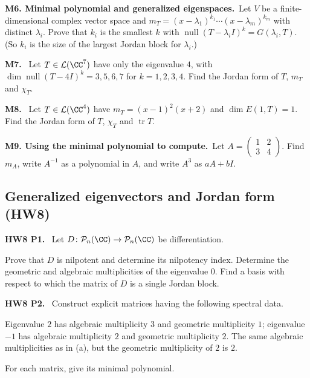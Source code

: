 \documentclass[10pt]{scrartcl}
\DeclareMathOperator{\nul}{null}
\DeclareMathOperator{\tr}{tr}
\newcommand{\LL}{\mathcal L}
\newcommand{\PP}{\mathcal P}
\newenvironment{prob}{\par\bigskip\noindent\begin{minipage}{\linewidth}\setlength{\parskip}{4pt}}{\end{minipage}\par}
\begin{document}
\begin{prob}
\textbf{M6. Minimal polynomial and generalized eigenspaces.}\ Let $V$ be a finite-dimensional complex vector space and $m_T=(x-\lambda_1)^{k_1}\cdots(x-\lambda_m)^{k_m}$ with distinct $\lambda_i$. Prove that $k_i$ is the smallest $k$ with $\nul(T-\lambda_iI)^k=G(\lambda_i,T)$. (So $k_i$ is the size of the largest Jordan block for $\lambda_i$.)
\end{prob}

\begin{prob}
\textbf{M7. }\ Let $T\in\LL(\CC^7)$ have only the eigenvalue $4$, with $\dim\nul(T-4I)^k=3,5,6,7$ for $k=1,2,3,4$. Find the Jordan form of $T$, $m_T$ and $\chi_T$.
\end{prob}

\begin{prob}
\textbf{M8. }\ Let $T\in\LL(\CC^4)$ have $m_T=(x-1)^2(x+2)$ and $\dim E(1,T)=1$. Find the Jordan form of $T$, $\chi_T$ and $\tr T$.
\end{prob}

\begin{prob}
\textbf{M9. Using the minimal polynomial to compute.}\ Let $A=\begin{pmatrix}1&2\\3&4\end{pmatrix}$. Find $m_A$, write $A^{-1}$ as a polynomial in $A$, and write $A^3$ as $aA+bI$.
\end{prob}

\subsection{Generalized eigenvectors and Jordan form (HW8)}

\begin{prob}
\textbf{HW8 P1. }\ Let $D\colon\PP_n(\CC)\to\PP_n(\CC)$ be differentiation.
\begin{enumerate}[(a)]
  \ii Prove that $D$ is nilpotent and determine its nilpotency index.
  \ii Determine the geometric and algebraic multiplicities of the eigenvalue $0$.
  \ii Find a basis with respect to which the matrix of $D$ is a single Jordan block.
\end{enumerate}
\end{prob}

\begin{prob}
\textbf{HW8 P2. }\ Construct explicit matrices having the following spectral data.
\begin{enumerate}[(a)]
  \ii Eigenvalue $2$ has algebraic multiplicity $3$ and geometric multiplicity $1$; eigenvalue $-1$ has algebraic multiplicity $2$ and geometric multiplicity $2$.
  \ii The same algebraic multiplicities as in (a), but the geometric multiplicity of $2$ is $2$.
\end{enumerate}
For each matrix, give its minimal polynomial.
\end{prob}
\end{document}
